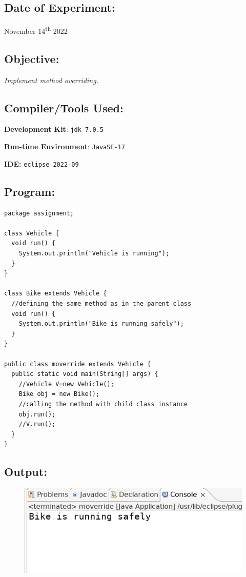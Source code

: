 \documentclass[12pt, a4paper]{article}
\begin{document}
\subsection*{Date of Experiment:}
November 14\textsuperscript{th} 2022

\subsection*{Objective:}
\emph{\large{Implement method overriding.}}

\subsection*{Compiler/Tools Used:}
\textbf{Development Kit}: \verb+jdk-7.0.5+

\textbf{Run-time Environment}: \verb+JavaSE-17+

\textbf{IDE:} \verb+eclipse 2022-09+

\subsection*{Program:}
\begin{lstlisting}
package assignment;

class Vehicle {
  void run() {
    System.out.println("Vehicle is running");
  }
}

class Bike extends Vehicle {
  //defining the same method as in the parent class  
  void run() {
    System.out.println("Bike is running safely");
  }
}

public class moverride extends Vehicle {
  public static void main(String[] args) {
    //Vehicle V=new Vehicle();
    Bike obj = new Bike();
    //calling the method with child class instance  
    obj.run();
    //V.run();
  }
}
\end{lstlisting}

\subsection*{Output:}
\begin{figure}[h]
  \centering
  \includegraphics[width=\textwidth]{moverride}
\end{figure}
\newpage
\end{document}
